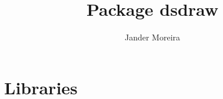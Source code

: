 \documentclass[10pt,a4paper]{article}
\title{Package \textsf{dsdraw}}
\author{Jander Moreira}
\begin{document}
\sloppy
\maketitle

%
%
%
%
%

\section{Libraries}




		
%

%
\end{document}
